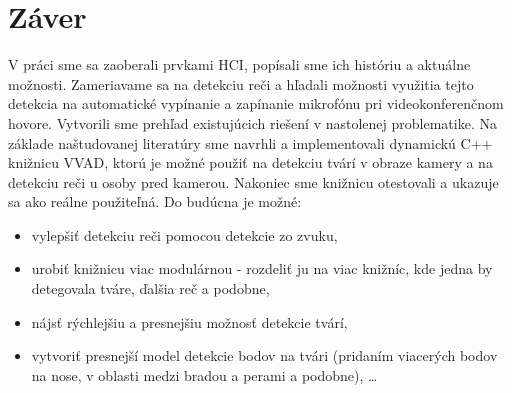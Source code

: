 \chapter*{Záver}
V práci sme sa zaoberali prvkami HCI, popísali sme ich históriu a aktuálne možnosti.
Zameriavame sa na detekciu reči a hľadali možnosti využitia tejto detekcia na automatické vypínanie a zapínanie mikrofónu pri videokonferenčnom hovore.
Vytvorili sme prehľad existujúcich riešení v nastolenej problematike.
Na základe naštudovanej literatúry sme navrhli a implementovali dynamickú C++ knižnicu VVAD, ktorú je možné použiť na detekciu tvárí v obraze kamery a na detekciu reči u osoby pred kamerou.
Nakoniec sme knižnicu otestovali a ukazuje sa ako reálne použiteľná. 
Do budúcna je možné:
\begin{itemize}
\item vylepšiť detekciu reči pomocou detekcie zo zvuku,
\item urobiť knižnicu viac modulárnou - rozdeliť ju na viac knižníc, kde jedna by detegovala tváre, ďalšia reč a podobne, 
\item nájsť rýchlejšiu a presnejšiu možnosť detekcie tvárí,
\item vytvoriť presnejší model detekcie bodov na tvári (pridaním viacerých bodov na nose, v oblasti medzi bradou a perami a podobne), \ldots
\end{itemize}